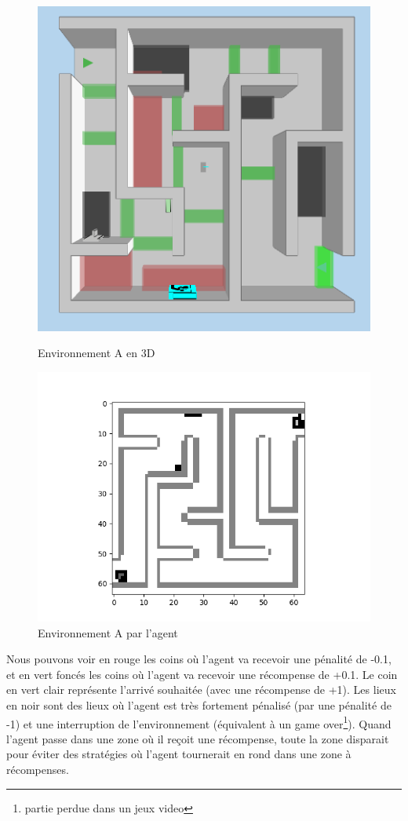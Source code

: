 \begin{figure}[h!]
\centering
\begin{minipage}{.5\textwidth}
  \centering
  \includegraphics[width=.5\linewidth]{./assets/SESTAR/env_sestar_agent.png}
  \caption{Environnement A en 3D}
  \label{fig:test1}
\end{minipage}%
\begin{minipage}{.5\textwidth}
  \centering
  \includegraphics[width=.65\linewidth]{./assets/SESTAR/vue_agent_1.png}
  \caption{\small{Environnement A par l'agent}}
  \label{fig:test2}
\end{minipage}
\end{figure}

Nous pouvons voir en rouge les coins où l'agent va recevoir une pénalité de -0.1, et en vert foncés les coins où l'agent va recevoir une récompense de +0.1. Le coin en vert clair représente l'arrivé souhaitée (avec une récompense de +1). Les lieux en noir sont des lieux où l'agent est très fortement pénalisé (par une pénalité de -1) et une interruption de l'environnement (équivalent à un game over\footnote{partie perdue dans un jeux video}). Quand l'agent passe dans une zone où il reçoit une récompense, toute la zone disparait pour éviter des stratégies où l'agent tournerait en rond dans une zone à récompenses. 

